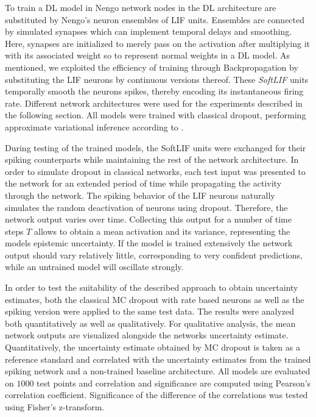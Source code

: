 \documentclass[10pt,a4paper,twocolumn]{article}
\begin{document}
To train a DL model in Nengo network nodes in the DL architecture are substituted by Nengo's neuron ensembles of LIF units. Ensembles are connected by simulated synapses which can implement temporal delays and smoothing. Here, synapses are initialized to merely pass on the activation after multiplying it with its associated weight so to represent normal weights in a DL model. As mentioned, we exploited the efficiency of training through Backpropagation by substituting the LIF neurons by continuous versions thereof. These \emph{SoftLIF} units temporally smooth the neurons spikes, thereby encoding its instantaneous firing rate. Different network architectures were used for the experiments described in the following section. All models were trained with classical dropout, performing approximate variational inference according to \cite{gal2016dropout}.

During testing of the trained models, the SoftLIF units were exchanged for their spiking counterparts while maintaining the rest of the network architecture. In order to simulate dropout in classical networks, each test input was presented to the network for an extended period of time while propagating the activity through the network. The spiking behavior of the LIF neurons naturally simulates the random deactivation of neurons using dropout. Therefore, the network output varies over time. Collecting this output for a number of time steps $T$ allows to obtain a mean activation and its variance, representing the models epistemic uncertainty. If the model is trained extensively the network output should vary relatively little, corresponding to very confident predictions, while an untrained model will oscillate strongly. 

In order to test the suitability of the described approach to obtain uncertainty estimates, both the classical MC dropout with rate based neurons as well as the spiking version were applied to the same test data. The results were analyzed both quantitatively as well as qualitatively. For qualitative analysis, the mean network outputs are visualized alongside the networks uncertainty estimate. Quantitatively, the uncertainty estimate obtained by MC dropout is taken as a reference standard and correlated with the uncertainty estimates from the trained spiking network and a non-trained baseline architecture. All models are evaluated on $1000$ test points and correlation and significance are computed using Pearson's correlation coefficient. Significance of the difference of the correlations was tested using Fisher's z-transform. 
\end{document}
